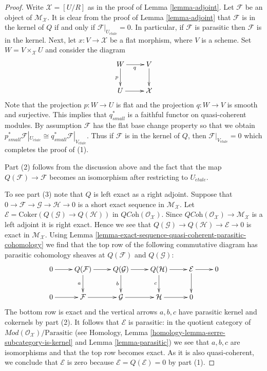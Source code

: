\begin{proof}
Write $\mathcal{X} = [U/R]$ as in the proof of Lemma \ref{lemma-adjoint}.
Let $\mathcal{F}$ be an object of $\mathcal{M}_\mathcal{X}$.
It is clear from the proof of Lemma \ref{lemma-adjoint}
that $\mathcal{F}$ is in the kernel of $Q$ if and only if
$\mathcal{F}|_{U_{\acute{e}tale}} = 0$.
In particular, if $\mathcal{F}$ is parasitic then $\mathcal{F}$ is in
the kernel. Next, let $x : V \to \mathcal{X}$ be a flat morphism, where
$V$ is a scheme. Set $W = V \times_\mathcal{X} U$ and consider the diagram
$$
\xymatrix{
W \ar[d]_p \ar[r]_q & V \ar[d] \\
U \ar[r] & \mathcal{X}
}
$$
Note that the projection $p : W \to U$ is flat and the projection
$q : W \to V$ is smooth and surjective. This implies that $q_{small}^*$
is a faithful functor on quasi-coherent modules. By assumption $\mathcal{F}$
has the flat base change property so that we obtain
$p_{small}^*\mathcal{F}|_{U_{\acute{e}tale}} \cong
q_{small}^*\mathcal{F}|_{V_{\acute{e}tale}}$. Thus if $\mathcal{F}$
is in the kernel of $Q$, then $\mathcal{F}|_{V_{\acute{e}tale}} = 0$
which completes the proof of (1).

\medskip\noindent
Part (2) follows from the discussion above and the fact
that the map $Q(\mathcal{F}) \to \mathcal{F}$ becomes an isomorphism after
restricting to $U_{\acute{e}tale}$.

\medskip\noindent
To see part (3) note that $Q$
is left exact as a right adjoint. Suppose that
$0 \to \mathcal{F} \to \mathcal{G} \to \mathcal{H} \to 0$
is a short exact sequence in $\mathcal{M}_\mathcal{X}$. Let
$\mathcal{E} = \text{Coker}(Q(\mathcal{G}) \to Q(\mathcal{H}))$ in
$\textit{QCoh}(\mathcal{O}_\mathcal{X})$. Since
$\textit{QCoh}(\mathcal{O}_\mathcal{X}) \to \mathcal{M}_\mathcal{X}$
is a left adjoint it is right exact. Hence we see that
$Q(\mathcal{G}) \to Q(\mathcal{H}) \to \mathcal{E} \to 0$
is exact in $\mathcal{M}_\mathcal{X}$. Using
Lemma \ref{lemma-exact-sequence-quasi-coherent-parasitic-cohomology}
we find that the top row of the following commutative diagram
has parasitic cohomology sheaves at $Q(\mathcal{F})$ and $Q(\mathcal{G})$:
$$
\xymatrix{
0 \ar[r] &
Q(\mathcal{F}) \ar[r] \ar[d]_a &
Q(\mathcal{G}) \ar[r] \ar[d]_b &
Q(\mathcal{H}) \ar[r] \ar[d]_c &
\mathcal{E} \ar[r] \ar[d] & 0 \\
0 \ar[r] &
\mathcal{F} \ar[r] &
\mathcal{G} \ar[r] &
\mathcal{H} \ar[r] & 0
}
$$
The bottom row is exact and the vertical arrows $a, b, c$
have parasitic kernel and cokernels by part (2). It follows that
$\mathcal{E}$ is parasitic: in the quotient category of
$\textit{Mod}(\mathcal{O}_\mathcal{X})/\text{Parasitic}$
(see Homology, Lemma \ref{homology-lemma-serre-subcategory-is-kernel} and 
Lemma \ref{lemma-parasitic})
we see that $a, b, c$ are isomorphisms and that the top row becomes
exact. As it is also quasi-coherent, we conclude
that $\mathcal{E}$ is zero because $\mathcal{E} = Q(\mathcal{E}) = 0$ by
part (1).
\end{proof}

